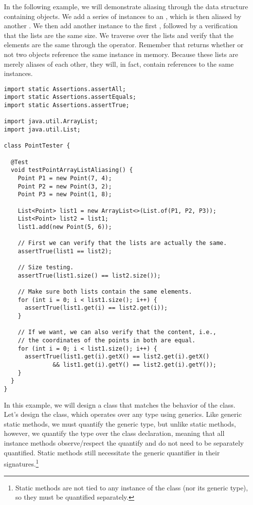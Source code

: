 In the following example, we will demonstrate aliasing through the  data structure containing  objects.
We add a series of  instances to an , which is then aliased by another . 
We then add another  instance to the first , followed by a verification that the lists are the same size. 
We traverse over the lists and verify that the elements are the same through the \ttt{==} operator. 
Remember that \ttt{==} returns whether or not two objects reference the same instance in memory. 
Because these lists are merely aliases of each other, they will, in fact, contain references to the same  instances.

\begin{lstlisting}[language=MyJava]
import static Assertions.assertAll;
import static Assertions.assertEquals;
import static Assertions.assertTrue;

import java.util.ArrayList;
import java.util.List;

class PointTester {

  @Test
  void testPointArrayListAliasing() {
    Point P1 = new Point(7, 4);
    Point P2 = new Point(3, 2);
    Point P3 = new Point(1, 8);

    List<Point> list1 = new ArrayList<>(List.of(P1, P2, P3));
    List<Point> list2 = list1;
    list1.add(new Point(5, 6));

    // First we can verify that the lists are actually the same.
    assertTrue(list1 == list2);

    // Size testing.
    assertTrue(list1.size() == list2.size());

    // Make sure both lists contain the same elements.
    for (int i = 0; i < list1.size(); i++) {
      assertTrue(list1.get(i) == list2.get(i));
    }

    // If we want, we can also verify that the content, i.e.,
    // the coordinates of the points in both are equal.
    for (int i = 0; i < list1.size(); i++) {
      assertTrue(list1.get(i).getX() == list2.get(i).getX()
              && list1.get(i).getY() == list2.get(i).getY());
    }
  }
}
\end{lstlisting}

In this example, we will design a class that matches the behavior of the  class. 
Let's design the  class, which operates over any type using generics. 
Like generic static methods, we must quantify the generic type, but unlike static methods, however, we quantify the type over the class declaration, meaning that all instance methods observe/respect the quantify and do not need to be separately quantified. 
Static methods still necessitate the generic quantifier in their signatures.\footnote{Static methods are not tied to any instance of the class (nor its generic type), so they must be quantified separately.}

